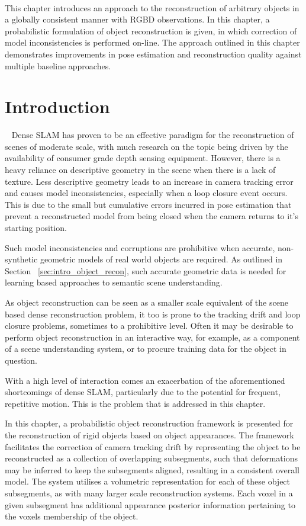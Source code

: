~\label{chap:probobj}
\begin{chapterabstract}
This chapter introduces an approach to the reconstruction of arbitrary objects 
in a globally consistent manner with RGBD observations. In this chapter, a 
probabilistic formulation of object reconstruction is given, in which correction 
of model inconsistencies is performed on-line. The approach outlined in this 
chapter demonstrates improvements in pose estimation and reconstruction quality 
against multiple baseline approaches.
\end{chapterabstract}

\section{Introduction}
~\label{sec:probobj_introduction}
Dense SLAM has proven to be an effective paradigm for the reconstruction of 
scenes of moderate scale, with much research on the topic being driven by the 
availability of consumer grade depth sensing equipment. However, there is a 
heavy reliance on descriptive geometry in the scene when there is a lack of 
texture. Less descriptive geometry leads to an increase in camera tracking 
error and causes model inconsistencies, especially when a loop closure event 
occurs. This is due to the small but cumulative errors incurred in pose 
estimation that prevent a reconstructed model from being closed when the 
camera returns to it's starting position.

Such model inconsistencies and corruptions are prohibitive when accurate, non-synthetic 
geometric models of real world objects are required. As outlined in Section
~\ref{sec:intro_object_recon}, such accurate geometric data is needed for learning 
based approaches to semantic scene understanding.

As object reconstruction can be seen as a smaller scale equivalent of the scene
based dense reconstruction problem, it too is prone to the tracking drift and
loop closure problems, sometimes to a prohibitive level. Often it may be
desirable to perform object reconstruction in an interactive way, for example,
as a component of a scene understanding system, or to procure training data for
the object in question.

With a high level of interaction comes an exacerbation of the aforementioned
shortcomings of dense SLAM, particularly due to the potential for frequent,
repetitive motion. This is the problem that is addressed in this chapter.

In this chapter, a probabilistic object reconstruction framework is presented
for the reconstruction of rigid objects based on object appearances.
The framework facilitates the correction of camera tracking drift by
representing the object to be reconstructed as a collection of overlapping
subsegments, such that deformations may be inferred to keep the subsegments
aligned, resulting in a consistent overall model. The system utilises a
volumetric representation for each of these object subsegments, as with many
larger scale reconstruction systems. Each voxel in a given subsegment has
additional appearance posterior information pertaining to the voxels membership
of the object.

